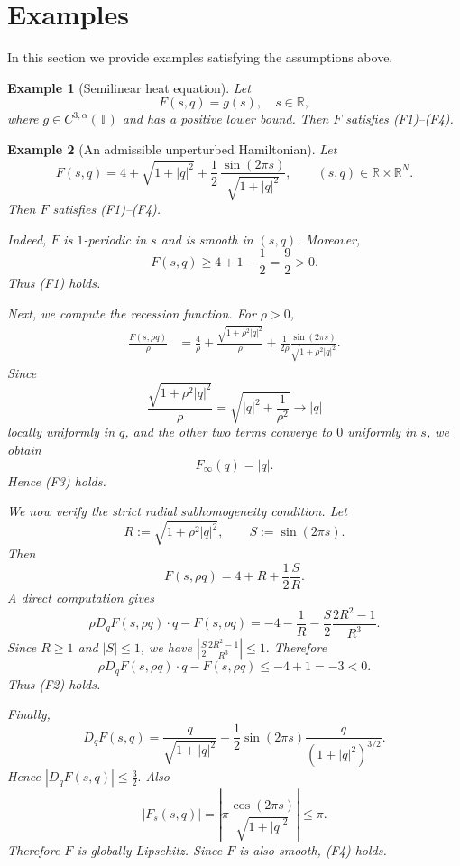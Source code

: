 \documentclass[preprint]{elsarticle}
\newtheorem{example}{Example}[section]
\numberwithin{equation}{section}
\begin{document}
\section{Examples}
In this section we provide examples satisfying the assumptions above.
\begin{example}[Semilinear heat equation]
 Let 
 \begin{equation*}
 F(s,q)=g(s), \quad s\in \mathbb R,
 \end{equation*}
 where $g\in C^{3,\alpha}(\mathbb T)$ and has a positive lower bound. Then $F$ satisfies \textup{(F1)--(F4)}.
\end{example}
\begin{example}[An admissible unperturbed Hamiltonian]
Let
\begin{equation*}
F(s,q)
=
4+\sqrt{1+|q|^2}
+
\frac12\,\frac{\sin(2\pi s)}{\sqrt{1+|q|^2}},
\qquad
(s,q)\in\mathbb R\times\mathbb R^N.
\end{equation*}
Then $F$ satisfies \textup{(F1)--(F4)}.

Indeed, $F$ is $1$-periodic in $s$ and is smooth in $(s,q)$. Moreover,
\begin{equation*}
F(s,q)
\ge
4+1-\frac12
=
\frac92>0.
\end{equation*}
Thus \textup{(F1)} holds.

Next, we compute the recession function. For $\rho>0$,
\begin{align*}
\frac{F(s,\rho q)}{\rho}
&=
\frac4\rho
+
\frac{\sqrt{1+\rho^2|q|^2}}{\rho}
+
\frac{1}{2\rho}\frac{\sin(2\pi s)}{\sqrt{1+\rho^2|q|^2}}.
\end{align*}
Since
$$
\frac{\sqrt{1+\rho^2|q|^2}}{\rho}
=
\sqrt{|q|^2+\frac1{\rho^2}}
\to |q|
$$
locally uniformly in $q$, and the other two terms converge to $0$ uniformly in $s$, we obtain
\begin{equation*}
F_\infty(q)=|q|.
\end{equation*}
Hence \textup{(F3)} holds.

We now verify the strict radial subhomogeneity condition. Let
$$
R:=\sqrt{1+\rho^2|q|^2},
\qquad
S:=\sin(2\pi s).
$$
Then
$$
F(s,\rho q)=4+R+\frac12\frac{S}{R}.
$$
A direct computation gives
\begin{equation*}
\rho D_qF(s,\rho q)\cdot q-F(s,\rho q)
=
-4-\frac1R
-\frac{S}{2}\frac{2R^2-1}{R^3}.
\end{equation*}
Since $R\ge1$ and $|S|\le1$, we have
$
\left|
\frac{S}{2}\frac{2R^2-1}{R^3}
\right|
\le 1.
$
Therefore
\begin{equation*}
\rho D_qF(s,\rho q)\cdot q-F(s,\rho q)
\le -4+1=-3<0.
\end{equation*}
Thus \textup{(F2)} holds.

Finally,
\begin{equation*}
D_qF(s,q)
=
\frac{q}{\sqrt{1+|q|^2}}
-
\frac12\sin(2\pi s)\frac{q}{(1+|q|^2)^{3/2}}.
\end{equation*}
Hence
$
|D_qF(s,q)|\le \frac32.
$
Also
$$
|F_s(s,q)|
=
\left|
\pi\frac{\cos(2\pi s)}{\sqrt{1+|q|^2}}
\right|
\le \pi.
$$
Therefore $F$ is globally Lipschitz. Since $F$ is also smooth, \textup{(F4)} holds.
\end{example}
\end{document}
